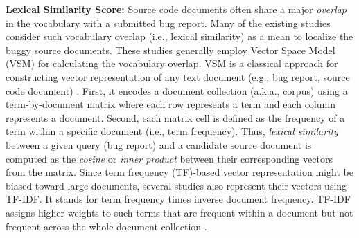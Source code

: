 \documentclass[sigconf,review,anonymous]{acmart}
\begin{document}
\textbf{Lexical Similarity Score:}
Source code documents often share a major \emph{overlap} in the vocabulary with a submitted bug report. Many of the existing studies \cite{Jian,Saha,Saha2,Wang2} consider such vocabulary overlap (i.e., lexical similarity) as a mean to localize the buggy source documents. These studies generally employ Vector Space Model (VSM) \cite{vector-space-model} for calculating the vocabulary overlap. VSM is a classical approach for constructing vector representation of any text document (e.g., bug report, source code document) \cite{vector-space-model}. First, it encodes a document collection (a.k.a., corpus) using a term-by-document matrix where each row represents a term and each column represents a document. Second, each matrix cell is defined as the frequency of a term within a specific document (i.e., term frequency). 
Thus, \emph{lexical similarity} between a given query (bug report) and a candidate source document is computed as the \emph{cosine} or \emph{inner product} between their corresponding vectors from the matrix.
Since term frequency (TF)-based vector representation might be biased toward large documents, several studies \cite{Jian,Saha} also represent their vectors using TF-IDF. It stands for term frequency times inverse document frequency.
TF-IDF assigns higher weights to such terms that are frequent within a document but not frequent across the whole document collection \cite{Salton}.       

\end{document}

